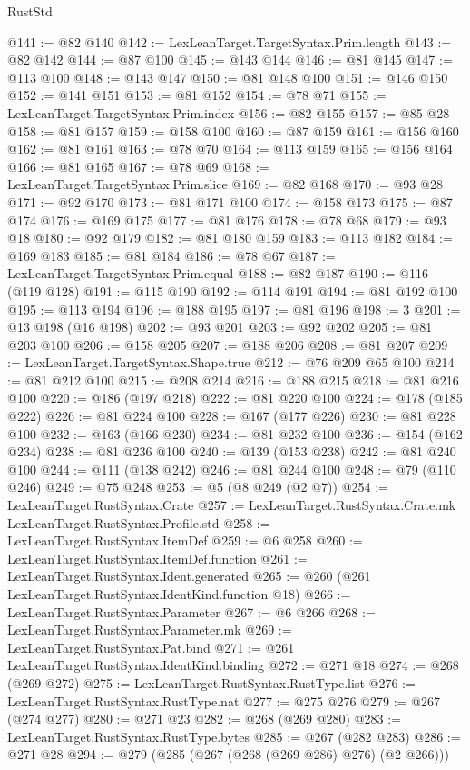 \begin{lexlean}{RustStd}
\begin{coremodule}
@141 := @82 @140
@142 := LexLeanTarget.TargetSyntax.Prim.length
@143 := @82 @142
@144 := @87 @100
@145 := @143 @144
@146 := @81 @145
@147 := @113 @100
@148 := @143 @147
@150 := @81 @148 @100
@151 := @146 @150
@152 := @141 @151
@153 := @81 @152
@154 := @78 @71
@155 := LexLeanTarget.TargetSyntax.Prim.index
@156 := @82 @155
@157 := @85 @28
@158 := @81 @157
@159 := @158 @100
@160 := @87 @159
@161 := @156 @160
@162 := @81 @161
@163 := @78 @70
@164 := @113 @159
@165 := @156 @164
@166 := @81 @165
@167 := @78 @69
@168 := LexLeanTarget.TargetSyntax.Prim.slice
@169 := @82 @168
@170 := @93 @28
@171 := @92 @170
@173 := @81 @171 @100
@174 := @158 @173
@175 := @87 @174
@176 := @169 @175
@177 := @81 @176
@178 := @78 @68
@179 := @93 @18
@180 := @92 @179
@182 := @81 @180 @159
@183 := @113 @182
@184 := @169 @183
@185 := @81 @184
@186 := @78 @67
@187 := LexLeanTarget.TargetSyntax.Prim.equal
@188 := @82 @187
@190 := @116 (@119 @128)
@191 := @115 @190
@192 := @114 @191
@194 := @81 @192 @100
@195 := @113 @194
@196 := @188 @195
@197 := @81 @196
@198 := 3
@201 := @13 @198 (@16 @198)
@202 := @93 @201
@203 := @92 @202
@205 := @81 @203 @100
@206 := @158 @205
@207 := @188 @206
@208 := @81 @207
@209 := LexLeanTarget.TargetSyntax.Shape.true
@212 := @76 @209 @65 @100
@214 := @81 @212 @100
@215 := @208 @214
@216 := @188 @215
@218 := @81 @216 @100
@220 := @186 (@197 @218)
@222 := @81 @220 @100
@224 := @178 (@185 @222)
@226 := @81 @224 @100
@228 := @167 (@177 @226)
@230 := @81 @228 @100
@232 := @163 (@166 @230)
@234 := @81 @232 @100
@236 := @154 (@162 @234)
@238 := @81 @236 @100
@240 := @139 (@153 @238)
@242 := @81 @240 @100
@244 := @111 (@138 @242)
@246 := @81 @244 @100
@248 := @79 (@110 @246)
@249 := @75 @248
@253 := @5 (@8 @249 (@2 @7))
@254 := LexLeanTarget.RustSyntax.Crate
@257 := LexLeanTarget.RustSyntax.Crate.mk LexLeanTarget.RustSyntax.Profile.std
@258 := LexLeanTarget.RustSyntax.ItemDef
@259 := @6 @258
@260 := LexLeanTarget.RustSyntax.ItemDef.function
@261 := LexLeanTarget.RustSyntax.Ident.generated
@265 := @260 (@261 LexLeanTarget.RustSyntax.IdentKind.function @18)
@266 := LexLeanTarget.RustSyntax.Parameter
@267 := @6 @266
@268 := LexLeanTarget.RustSyntax.Parameter.mk
@269 := LexLeanTarget.RustSyntax.Pat.bind
@271 := @261 LexLeanTarget.RustSyntax.IdentKind.binding
@272 := @271 @18
@274 := @268 (@269 @272)
@275 := LexLeanTarget.RustSyntax.RustType.list
@276 := LexLeanTarget.RustSyntax.RustType.nat
@277 := @275 @276
@279 := @267 (@274 @277)
@280 := @271 @23
@282 := @268 (@269 @280)
@283 := LexLeanTarget.RustSyntax.RustType.bytes
@285 := @267 (@282 @283)
@286 := @271 @28
@294 := @279 (@285 (@267 (@268 (@269 @286) @276) (@2 @266)))

\end{coremodule}
\end{lexlean}
